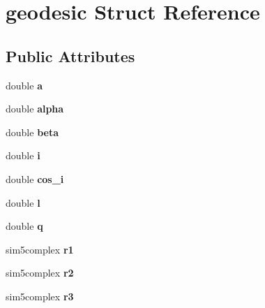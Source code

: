\hypertarget{structgeodesic}{}\section{geodesic Struct Reference}
\label{structgeodesic}
\subsection*{Public Attributes}
\begin{DoxyCompactItemize}
\item 
\mbox{\label{structgeodesic_ade894461117fa356e164f6db26670437}} 
double {\bfseries a}
\item 
\mbox{\label{structgeodesic_acfd591af3a201f661c65b546079398dd}} 
double {\bfseries alpha}
\item 
\mbox{\label{structgeodesic_aeafad393486081ed9c8d8c7a58629aec}} 
double {\bfseries beta}
\item 
\mbox{\label{structgeodesic_a53ebad98027b00318a63a7d081c07445}} 
double {\bfseries i}
\item 
\mbox{\label{structgeodesic_a8afee462ad17b09f195b5b73c1b16ec8}} 
double {\bfseries cos\+\_\+i}
\item 
\mbox{\label{structgeodesic_a2b038ead9f6f4a053300c8c562699c06}} 
double {\bfseries l}
\item 
\mbox{\label{structgeodesic_a8a612d291dfdfcbad89ed32a49950624}} 
double {\bfseries q}
\item 
\mbox{\label{structgeodesic_a423503275aa0d9959267961b89ca2d21}} 
sim5complex {\bfseries r1}
\item 
\mbox{\label{structgeodesic_a70995faae3e228c6320a6e0a9fcd46e4}} 
sim5complex {\bfseries r2}
\item 
\mbox{\label{structgeodesic_af44c48aebffd007f3a0fc1f355553972}} 
sim5complex {\bfseries r3}
\item 
\mbox{\label{structgeodesic_aa7a002154e2c5dea01548946d0127880}} 

\end{DoxyCompactItemize}
